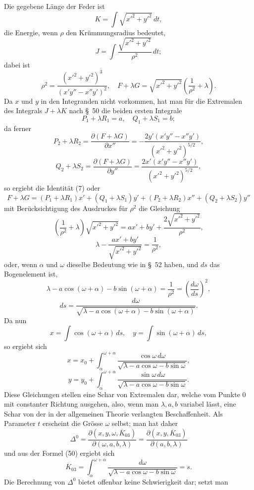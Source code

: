 \documentclass[11pt,a4paper,leqno]{article}
\begin{document}
Die gegebene Länge der Feder ist
\[
K=\int\sqrt{x'^2+y'^2}\,dt,
\]
die Energie, wenn $\rho$ den Krümmungsradius bedeutet,
\[
J=\int\frac{\sqrt{x'^2+y'^2}}{\rho^2}\,dt;
\]
dabei ist
\[
\rho^2=\frac{(x'^2+y'^2)^3}{(x'y''-x''y')^2},
\quad
F+\lambda G=\sqrt{x'^2+y'^2}\left(\frac1{\rho^2}+\lambda\right).
\]
Da $x$ und $y$ in den Integranden nicht vorkommen, hat man für die Extremalen des Integrals $J+\lambda K$ nach \S~50 die beiden ersten Integrale
\[
P_1+\lambda R_1=a,\quad Q_1+\lambda S_1=b;
\]
da ferner
\[
P_2+\lambda R_2
=\frac{\partial(F+\lambda G)}{\partial x''}
=-\frac{2y'(x'y''-x''y')}{(x'^2+y'^2)^{5/2}},
\]
\[
Q_2+\lambda S_2
=\frac{\partial(F+\lambda G)}{\partial y''}
=\frac{2x'(x'y''-x''y')}{(x'^2+y'^2)^{5/2}},
\]
so ergiebt die Identität (7) oder
\[
F+\lambda G=(P_1+\lambda R_1)x'+(Q_1+\lambda S_1)y'
+(P_2+\lambda R_2)x''+(Q_2+\lambda S_2)y''
\]
mit Berücksichtigung des Ausdruckes für $\rho^2$ die Gleichung
\[
\left(\frac1{\rho^2}+\lambda\right)\sqrt{x'^2+y'^2}
=ax'+by'+\frac{2\sqrt{x'^2+y'^2}}{\rho^2},
\]
\[
\lambda-\frac{ax'+by'}{\sqrt{x'^2+y'^2}}=\frac1{\rho^2},
\]
oder, wenn $\alpha$ und $\omega$ dieselbe Bedeutung wie in \S~52 haben, und $ds$ das Bogenelement ist,
\begin{equation}\tag{49}
\lambda-a\cos(\omega+\alpha)-b\sin(\omega+\alpha)
=\frac1{\rho^2}=\left(\frac{d\omega}{ds}\right)^2,
\end{equation}
\begin{equation}\tag{50}
ds=\frac{d\omega}{\sqrt{\lambda-a\cos(\omega+\alpha)-b\sin(\omega+\alpha)}}.
\end{equation}
Da nun
\[
x=\int\cos(\omega+\alpha)\,ds,\quad
y=\int\sin(\omega+\alpha)\,ds,
\]
so ergiebt sich
\[
x=x_0+\int_\alpha^{\omega+\alpha}
\frac{\cos\omega\,d\omega}{\sqrt{\lambda-a\cos\omega-b\sin\omega}},
\]
\[
y=y_0+\int_\alpha^{\omega+\alpha}
\frac{\sin\omega\,d\omega}{\sqrt{\lambda-a\cos\omega-b\sin\omega}}.
\]
Diese Gleichungen stellen eine Schar von Extremalen dar, welche vom Punkte 0 mit constanter Richtung ausgehen, also, wenn man $\lambda,a,b$ variabel lässt, eine Schar von der in der allgemeinen Theorie verlangten Beschaffenheit. Als Parameter $t$ erscheint die Grösse $\omega$ selbst; man hat daher
\[
\Delta^0=
\frac{\partial(x,y,\omega,\overline{K}_{03})}{\partial(\omega,a,b,\lambda)}
=
\frac{\partial(x,y,\overline{K}_{03})}{\partial(a,b,\lambda)}
\]
und aus der Formel (50) ergiebt sich
\[
\overline{K}_{03}=
\int_\alpha^{\omega+\alpha}\frac{d\omega}{\sqrt{\lambda-a\cos\omega-b\sin\omega}}=s.
\]
Die Berechnung von $\Delta^0$ bietet offenbar keine Schwierigkeit dar; setzt man
\end{document}
